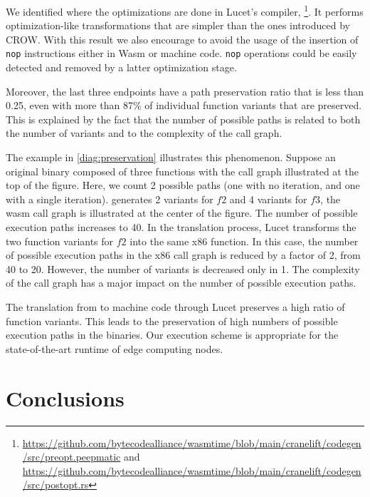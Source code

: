 We identified where the optimizations are done in Lucet's compiler, \footnote{\url{https://github.com/bytecodealliance/wasmtime/blob/main/cranelift/codegen/src/preopt.peepmatic} and \url{https://github.com/bytecodealliance/wasmtime/blob/main/cranelift/codegen/src/postopt.rs}}. It performs optimization-like transformations that are simpler than the ones introduced by CROW. 
With this result we also encourage to avoid the usage of the insertion of \texttt{nop} instructions either in Wasm or machine code. \texttt{nop} operations could be easily detected and removed by a latter optimization stage.



Moreover, the last three endpoints have a path preservation ratio that is less than 0.25, even with more than 87\%  of individual function  variants that are preserved. This is explained by the fact that the number of possible paths is related to both the number of variants and to the complexity of the call graph.



The example in \autoref{diag:preservation}  illustrates this phenomenon.
Suppose an original binary composed of three functions with the call graph illustrated at the top of the figure. Here, we count 2 possible paths (one with no iteration, and one with a single iteration).
\tool generates 2 variants for $f2$ and 4 variants for $f3$, the wasm call graph is illustrated at the center of the figure. The number of possible execution paths increases to 40.
In the translation process, Lucet transforms the two \wasm function variants for $f2$ into the same x86 function.
In this case, the number of possible execution paths in the x86 call graph is reduced by a factor of 2, from 40 to 20.
However, the number of variants is decreased only in 1. 
The complexity of the call graph has a major impact on the number of possible execution paths. 


	The translation from \wasm to machine code through Lucet preserves a high ratio of function variants. This leads to the preservation of high numbers of possible execution paths in the binaries. 
	Our execution scheme is appropriate for the state-of-the-art runtime of edge computing nodes.


\section{Conclusions}

